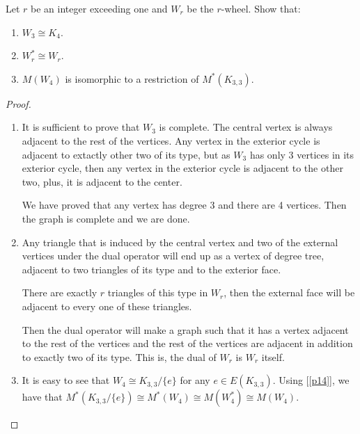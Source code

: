 \prob
{\label{p11}
    Let $r$ be an integer exceeding one and $W_r$ be the $r$-wheel. Show that:
    \begin{enumerate}[label=(\roman*)]
        \item $W_3 \cong K_4$.
        \item $W_r^* \cong W_r$.
        \item $M(W_4)$ is isomorphic to a restriction of $M^*(K_{3,3})$.
    \end{enumerate}
}
\begin{proof}$\,$\pn

    \begin{enumerate}
        \item   It is sufficient to prove that $W_3$ is complete.\pn
                The central vertex is always adjacent to the rest of the vertices.\pn
                Any vertex in the exterior cycle is adjacent to extactly other two of its type, but as $W_3$ has
                only 3 vertices in its exterior cycle, then any vertex in the exterior cycle is adjacent to the other
                two, plus, it is adjacent to the center.\pn
                
                We have proved that any vertex has degree 3 and there are 4 vertices. Then the graph is complete and
                we are done.\pn
                
        \item   Any triangle that is induced by the central vertex and two of the external vertices under the
                dual operator will end up as a vertex of degree tree, adjacent to two triangles of its type and
                to the exterior face.\pn
                
                There are exactly $r$ triangles of this type in $W_r$, then the external face will be adjacent to
                every one of these triangles.\pn
                
                Then the dual operator will make a graph such that it has a vertex adjacent to the rest of the vertices and
                the rest of the vertices are adjacent in addition to exactly two of its type. This is, the dual of 
                $W_r$ is $W_r$ itself.\pn
                
        \item   It is easy to see that $W_4 \cong K_{3, 3} / \{e\}$ for any $e \in E(K_{3, 3})$. Using [\ref{p14}], we have that
                $M^*(K_{3, 3} / \{e\}) \cong M^*(W_4) \cong M(W_4^*) \cong M(W_4)$.
                
    \end{enumerate}
\end{proof}